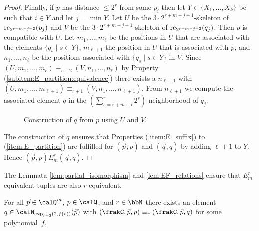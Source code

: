 \begin{proof}
	
	Finally, if $p$ has distance $\leq 2^{r}$ from some $p_i$ then let $Y\in \{X_1,\ldots,X_k\}$ be such that $i\in Y$ and let $j=\min Y$. Let $U$ be the $3\cdot 2^{r+m-j+1}$-skeleton of $\operatorname{rc}_{2^{r+m-j+2}}(p_j)$ and 
	$V$ be the $3\cdot 2^{r+m-j+1}$-skeleton of $\operatorname{rc}_{2^{r+m-j+2}}(q_j)$.
	 Then $p$ is compatible with $U$. Let $m_1,\ldots,m_\ell$ be the positions in $U$ that are associated with the elements $\{q_s \mid s\in Y\}$, $m_{\ell+1}$ the position in $U$ that is associated with $p$, and $n_1,\ldots,n_\ell$ be the positions associated with $\{q_s \mid s\in Y\}$ in $V$. Since $(U,m_1,\ldots,m_\ell) \equiv_{r+2} (V,n_1,\ldots,n_\ell)$ by Property (\ref{subitem:E_partition:equivalence}) there exists a $n_{\ell+1}$ with $(U,m_1,\ldots,m_{\ell+1}) \equiv_{r+1} (V,n_1,\ldots,n_{\ell+1})$. From $n_{\ell+1}$ we compute the associated element $q$
	in the $(\sum_{s= r+m-i}^{r} 2^s)$-neighborhood of $q_j$.
	\begin{figure}[h]
		\centering
		\caption{\label{fig:skeleton}Construction of $q$ from $p$ using $U$ and $V$.}
	\end{figure}
	The construction of $q$ ensures that Properties (\ref{item:E_suffix}) to (\ref{item:E_partition}) are fulfilled for $(\vec{p}, p)$ and $(\vec{q}, q)$ by adding $\ell+1$ to $Y$. Hence $(\vec{p}, p) E^r_m (\vec{q}, q)$.
\end{proof}

The Lemmata \ref{lem:partial_isomorphism} and \ref{lem:EF_relations} ensure that $E^r_m$-equivalent tuples are also $r$-equivalent.

\begin{corollary}\label{cor:equivalence}
	For all $\vec{p}\in \Qx^m$, $p\in \Qx$, and $r\in\bbN$ there exists an element $q\in \calN_{\exp_{r+2}(2,f(r))}(\vec{p})$ with $(\frakC, \vec{p}, p) \equiv_r (\frakC,\vec{p}, q)$ for some polynomial~$f$.
\end{corollary}


